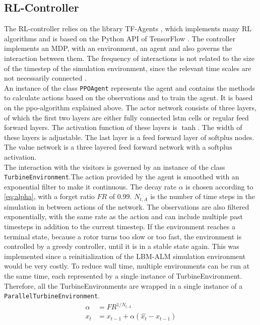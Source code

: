\subsection{RL-Controller}
The RL-controller relies on the library TF-Agents \cite{guadarrama_tf-agents_2018}, which implements many RL algorithms and is based on the Python API of TensorFlow \cite{abadi_tensorflow_2015}. The controller implements an MDP, with an environment, an agent and also governs the interaction between them. The frequency of interactions is not related to the size of the timestep of the simulation environment, since the relevant time scales are not necessarily connected \cite{rabault_deep_2018-1}. \\
An instance of the class \texttt{PPOAgent} represents the agent and contains the methods to calculate actions based on the observations and to train the agent. It is based on the ppo-algorithm explained above. The actor network consists of three layers, of which the first two layers are either fully connected lstm cells or regular feed forward layers. The activation function of these layers is $\tanh$. The width of these layers is adjustable. The last layer is a feed forward layer of $\mathrm{softplus}$ nodes. The value network is a three layered feed forward network with a $\mathrm{softplus}$ activation. \\
The interaction with the visitors is governed by an instance of the class \texttt{TurbineEnvironment}.The action provided by the agent is smoothed with an exponential filter to make it continuous. The decay rate $\alpha$ is chosen according to \eqref{eq:alpha}, with a forget ratio $FR$ of \SI{0.99}{}. $N_{t,A}$ is the number of time steps in the simulation in between actions of the network. The observations are also filtered exponentially, with the same rate as the action and can include multiple past timesteps in addition to the current timestep. If the environment reaches a terminal state, because a rotor turns too slow or too fast, the environment is controlled by a greedy controller, until it is in a stable state again. This was implemented since a reinitialization of the LBM-ALM simulation environment would be very costly. To reduce wall time, multiple environments can be run at the same time, each represented by a single instance of TurbineEnvironment. Therefore, all the TurbineEnvironments are wrapped in a single instance of a \texttt{ParallelTurbineEnvironment}. \\
\begin{align}
	\alpha &= FR^{1/N_{t,A}} \label{eq:alpha}\\
	x_t &= x_{t-1} + \alpha(\hat{x_t} - x_{t-1})
\end{align}
